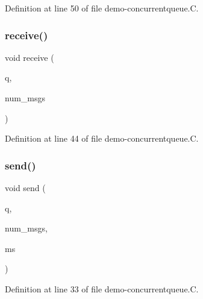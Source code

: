 Definition at line 50 of file demo-\/concurrentqueue.\+C.

\mbox{\label{demo-concurrentqueue_8_c_ab141b5e3494a69e30757648ece395552}} 
\subsubsection{\texorpdfstring{receive()}{receive()}}
{\footnotesize\ttfamily void receive (\begin{DoxyParamCaption}\item[{\hyperlink{class_designar_1_1_concurrent_queue}{Concurrent\+Queue}$<$ string $>$ \&}]{q,  }\item[{\hyperlink{namespace_designar_aa72662848b9f4815e7bf31a7cf3e33d1}{nat\+\_\+t}}]{num\+\_\+msgs }\end{DoxyParamCaption})}



Definition at line 44 of file demo-\/concurrentqueue.\+C.

\mbox{\label{demo-concurrentqueue_8_c_aa97d75998c4e7c6e867a476cb2ac4fba}} 
\subsubsection{\texorpdfstring{send()}{send()}}
{\footnotesize\ttfamily void send (\begin{DoxyParamCaption}\item[{\hyperlink{class_designar_1_1_concurrent_queue}{Concurrent\+Queue}$<$ string $>$ \&}]{q,  }\item[{\hyperlink{namespace_designar_aa72662848b9f4815e7bf31a7cf3e33d1}{nat\+\_\+t}}]{num\+\_\+msgs,  }\item[{\hyperlink{namespace_designar_aa72662848b9f4815e7bf31a7cf3e33d1}{nat\+\_\+t}}]{ms }\end{DoxyParamCaption})}



Definition at line 33 of file demo-\/concurrentqueue.\+C.

